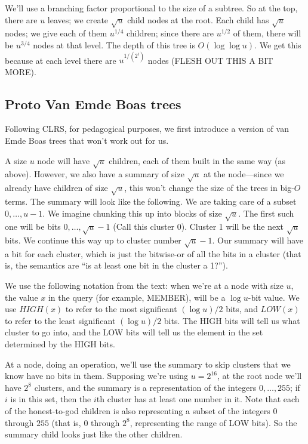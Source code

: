 \documentclass{article}
\begin{document}
We'll use a branching factor proportional to the size of a subtree.
So at the top, there are $u$ leaves; we create $\sqrt u$ child nodes
at the root.
Each child has $\sqrt u$ nodes; we give each of them $u^{1/4}$ children;
since there are $u^{1/2}$ of them, there will be $u^{3/4}$ nodes at
that level.
The depth of this tree is $O(\log\log u)$.
We get this because at each level there are $u^{1/(2^i)}$ nodes (FLESH
OUT THIS A BIT MORE).

\subsection{Proto Van Emde Boas trees}

Following CLRS, for pedagogical purposes, we first introduce a version of 
van Emde Boas trees that won't work out for us.

A size $u$ node will have $\sqrt u$ children, each of them built in
the same way (as above).
However, we also have a summary of size $\sqrt u$ at the node---since
we already have children of size $\sqrt u$, this won't change the size of the 
trees in big-$O$ terms.
The summary will look like the following.
We are taking care of a subset $0,\ldots,u-1$.
We imagine chunking this up into blocks of size $\sqrt u$.
The first such one will be bits $0,\ldots,\sqrt u - 1$ (Call this cluster 0).
Cluster 1 will be the next $\sqrt u$ bits.
We continue this way up to cluster number $\sqrt u - 1$.
Our summary will have a bit for each cluster, which is just the bitwise-or
of all the bits in a cluster (that is, the semantics are ``is at least
one bit in the cluster a 1?'').

We use the following notation from the text: when we're at a node with size 
$u$, the value $x$ in the query (for example, MEMBER), will be a $\log u$-bit
value.
We use $HIGH(x)$ to refer to the most significant $(\log u) / 2$ bits, 
and $LOW(x)$ to refer to the least significant $(\log u) / 2$ bits.
The HIGH bits will tell us what cluster to go into, and the LOW bits
will tell us the element in the set determined by the HIGH bits.




At a node, doing an operation, we'll use the summary to skip clusters that
we know have no bits in them.
Supposing we're using $u = 2^{16}$, at the root node we'll have $2^8$ clusters,
and the summary is a representation of the integers $0,\ldots,255$; if $i$
is in this set, then the $i$th cluster has at least one number in it.
Note that each of the honest-to-god children is also representing a subset
of the integers $0$ through $255$ (that is, $0$ through $2^8$, representing
the range of LOW bits).
So the summary child looks just like the other children.
\end{document}
